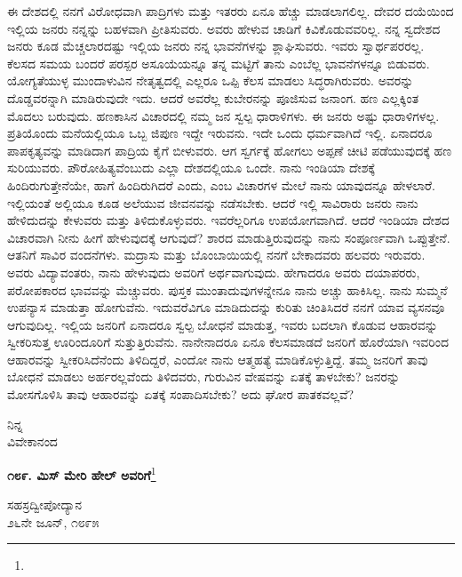 ಈ ದೇಶದಲ್ಲಿ ನನಗೆ ವಿರೋಧವಾಗಿ ಪಾದ್ರಿಗಳು ಮತ್ತು ಇತರರು ಏನೂ ಹೆಚ್ಚು ಮಾಡಲಾಗಲಿಲ್ಲ. ದೇವರ ದಯೆಯಿಂದ ಇಲ್ಲಿಯ ಜನರು ನನ್ನನ್ನು ಬಹಳವಾಗಿ ಪ್ರೀತಿಸುವರು. ಅವರು ಹೇಳುವ ಚಾಡಿಗೆ ಕಿವಿಕೊಡುವವರಿಲ್ಲ. ನನ್ನ ಸ್ವದೇಶದ ಜನರು ಕೂಡ ಮೆಚ್ಚಲಾರದಷ್ಟು ಇಲ್ಲಿಯ ಜನರು ನನ್ನ ಭಾವನೆಗಳನ್ನು ಶ್ಲಾಘಿಸುವರು. ಇವರು ಸ್ವಾರ್ಥಪರರಲ್ಲ. ಕೆಲಸದ ಸಮಯ ಬಂದರೆ ಪರಸ್ಪರ ಅಸೂಯೆಯನ್ನೂ ತನ್ನ ಮಟ್ಟಿಗೆ ತಾನು ಎಂಬೆಲ್ಲ ಭಾವನೆಗಳನ್ನೂ ಬಿಡುವರು. ಯೋಗ್ಯತೆಯುಳ್ಳ ಮುಂದಾಳುವಿನ ನೇತೃತ್ವದಲ್ಲಿ ಎಲ್ಲರೂ ಒಪ್ಪಿ ಕೆಲಸ ಮಾಡಲು ಸಿದ್ಧರಾಗಿರುವರು. ಅವರನ್ನು ದೊಡ್ಡವರನ್ನಾಗಿ ಮಾಡಿರುವುದೇ ಇದು. ಆದರೆ ಅವರೆಲ್ಲ ಕುಬೇರನನ್ನು ಪೂಜಿಸುವ ಜನಾಂಗ. ಹಣ ಎಲ್ಲಕ್ಕಿಂತ ಮೊದಲು ಬರುವುದು. ಹಣಕಾಸಿನ ವಿಚಾರದಲ್ಲಿ ನಮ್ಮ ಜನ ಸ್ವಲ್ಪ ಧಾರಾಳಿಗಳು. ಈ ಜನರು ಅಷ್ಟು ಧಾರಾಳಿಗಳಲ್ಲ. ಪ್ರತಿಯೊಂದು ಮನೆಯಲ್ಲಿಯೂ ಒಬ್ಬ ಜಿಪುಣ ಇದ್ದೇ ಇರುವನು. ಇದೇ ಒಂದು ಧರ್ಮವಾಗಿದೆ ಇಲ್ಲಿ. ಏನಾದರೂ ಪಾಪಕೃತ್ಯವನ್ನು ಮಾಡಿದಾಗ ಪಾದ್ರಿಯ ಕೈಗೆ ಬೀಳುವರು. ಆಗ ಸ್ವರ್ಗಕ್ಕೆ ಹೋಗಲು ಅಪ್ಪಣೆ ಚೀಟಿ ಪಡೆಯುವುದಕ್ಕೆ ಹಣ ಸುರಿಯುವರು. ಪೌರೋಹಿತ್ಯವೆಂಬುದು ಎಲ್ಲಾ ದೇಶದಲ್ಲಿಯೂ ಒಂದೇ. ನಾನು ಇಂಡಿಯಾ ದೇಶಕ್ಕೆ ಹಿಂದಿರುಗುತ್ತೇನೆಯೇ, ಹಾಗೆ ಹಿಂದಿರುಗಿದರೆ ಎಂದು, ಎಂಬ ವಿಚಾರಗಳ ಮೇಲೆ ನಾನು ಯಾವುದನ್ನೂ ಹೇಳಲಾರೆ. ಇಲ್ಲಿಯಂತೆ ಅಲ್ಲಿಯೂ ಕೂಡ ಅಲೆಯುವ ಜೀವನವನ್ನು ನಡೆಸಬೇಕು. ಆದರೆ ಇಲ್ಲಿ ಸಾವಿರಾರು ಜನರು ನಾನು ಹೇಳಿದುದನ್ನು ಕೇಳುವರು ಮತ್ತು ತಿಳಿದುಕೊಳ್ಳುವರು. ಇವರೆಲ್ಲರಿಗೂ ಉಪಯೋಗವಾಗಿದೆ. ಆದರೆ ಇಂಡಿಯಾ ದೇಶದ ವಿಚಾರವಾಗಿ ನೀನು ಹೀಗೆ ಹೇಳುವುದಕ್ಕೆ ಆಗುವುದೆ? ಶಾರದ ಮಾಡುತ್ತಿರುವುದನ್ನು ನಾನು ಸಂಪೂರ್ಣವಾಗಿ ಒಪ್ಪುತ್ತೇನೆ. ಆತನಿಗೆ ಸಾವಿರ ವಂದನೆಗಳು. ಮದ್ರಾಸು ಮತ್ತು ಬೊಂಬಾಯಿಯಲ್ಲಿ ನನಗೆ ಬೇಕಾದವರು ಹಲವರು ಇರುವರು. ಅವರು ವಿದ್ಯಾವಂತರು, ನಾನು ಹೇಳುವುದು ಅವರಿಗೆ ಅರ್ಥವಾಗುವುದು. ಹೇಗಾದರೂ ಅವರು ದಯಾಪರರು, ಪರೋಪಕಾರದ ಭಾವವನ್ನು ಮೆಚ್ಚುವರು. ಪುಸ್ತಕ ಮುಂತಾದುವುಗಳನ್ನೇನೂ ನಾನು ಅಚ್ಚು ಹಾಕಿಸಿಲ್ಲ. ನಾನು ಸುಮ್ಮನೆ ಉಪನ್ಯಾಸ ಮಾಡುತ್ತಾ ಹೋಗುವೆನು. ಇದುವರೆವಿಗೂ ಮಾಡಿದುದನ್ನು ಕುರಿತು ಚಿಂತಿಸಿದರೆ ನನಗೆ ಯಾವ ವ್ಯಸನವೂ ಆಗುವುದಿಲ್ಲ. ಇಲ್ಲಿಯ ಜನರಿಗೆ ಏನಾದರೂ ಸ್ವಲ್ಪ ಬೋಧನೆ ಮಾಡುತ್ತ, ಇವರು ಬದಲಾಗಿ ಕೊಡುವ ಆಹಾರವನ್ನು ಸ್ವೀಕರಿಸುತ್ತ ಊರಿಂದೂರಿಗೆ ಸುತ್ತುತ್ತಿರುವೆನು. ನಾನೇನಾದರೂ ಏನೂ ಕೆಲಸಮಾಡದೆ ಜನರಿಗೆ ಹೊರೆಯಾಗಿ ಇವರಿಂದ ಆಹಾರವನ್ನು ಸ್ವೀಕರಿಸಿದೆನೆಂದು ತಿಳಿದಿದ್ದರೆ, ಎಂದೋ ನಾನು ಆತ್ಮಹತ್ಯೆ ಮಾಡಿಕೊಳ್ಳುತ್ತಿದ್ದೆ. ತಮ್ಮ ಜನರಿಗೆ ತಾವು ಬೋಧನೆ ಮಾಡಲು ಅರ್ಹರಲ್ಲವೆಂದು ತಿಳಿದವರು, ಗುರುವಿನ ವೇಷವನ್ನು ಏತಕ್ಕೆ ತಾಳಬೇಕು? ಜನರನ್ನು ಮೋಸಗೊಳಿಸಿ ತಾವು ಆಹಾರವನ್ನು ಏತಕ್ಕೆ ಸಂಪಾದಿಸಬೇಕು? ಅದು ಘೋರ ಪಾತಕವಲ್ಲವೆ?

\vspace{-0.5cm}

{\flushright
ನಿನ್ನ\\ವಿವೇಕಾನಂದ\par}
\vspace{-0.3cm}

\begin{center}
\textbf{೧೮೯. ಮಿಸ್ ಮೇರಿ ಹೇಲ್‌ ಅವರಿಗೆ}\footnote{}
\end{center}
\vspace{-0.5cm}

\begin{flushright}
ಸಹಸ್ರದ್ವೀಪೋದ್ಯಾನ\\೨೬ನೇ ಜೂನ್, ೧೮೯೫
\end{flushright}

